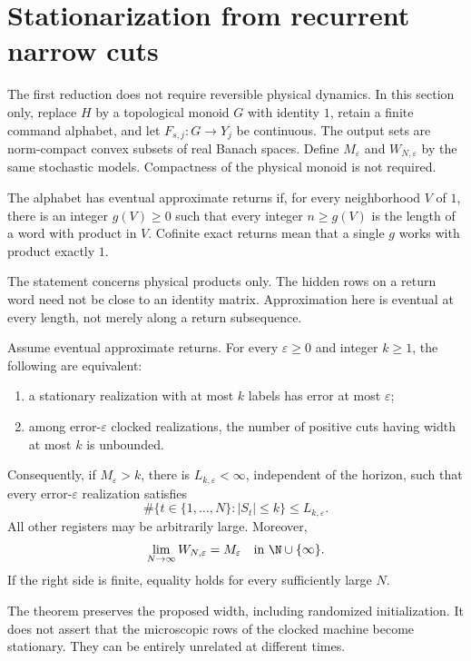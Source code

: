 \section{Stationarization from recurrent narrow cuts}\label{sec:ramsey56}
The first reduction does not require reversible physical dynamics. In this section only, replace $H$ by a topological monoid $G$ with identity $1$, retain a finite command alphabet, and let $F_{s,j}:G\to Y_j$ be continuous. The output sets are norm-compact convex subsets of real Banach spaces. Define $M_\varepsilon$ and $W_{N,\varepsilon}$ by the same stochastic models. Compactness of the physical monoid is not required.

\begin{definition}\label{def:returns56}
The alphabet has eventual approximate returns if, for every neighborhood $V$ of $1$, there is an integer $g(V)\ge0$ such that every integer $n\ge g(V)$ is the length of a word with product in $V$. Cofinite exact returns mean that a single $g$ works with product exactly $1$.
\end{definition}
The statement concerns physical products only. The hidden rows on a return word need not be close to an identity matrix. Approximation here is eventual at every length, not merely along a return subsequence.

\begin{theorem}\label{thm:stationarization56}
Assume eventual approximate returns. For every $\varepsilon\ge0$ and integer $k\ge1$, the following are equivalent:
\begin{enumerate}
\item a stationary realization with at most $k$ labels has error at most $\varepsilon$;
\item among error-$\varepsilon$ clocked realizations, the number of positive cuts having width at most $k$ is unbounded.
\end{enumerate}
Consequently, if $M_\varepsilon>k$, there is $L_{k,\varepsilon}<\infty$, independent of the horizon, such that every error-$\varepsilon$ realization satisfies
\begin{equation}\label{eq:occupation56}
 \#\{t\in\{1,\ldots,N\}:|S_t|\le k\}\le L_{k,\varepsilon}.
\end{equation}
All other registers may be arbitrarily large. Moreover,
\begin{equation}\label{eq:limitminimum56}
                  \lim_{N\to\infty}W_{N,\varepsilon}=M_\varepsilon
                  \quad\hbox{in }\N\cup\{\infty\}.
\end{equation}
If the right side is finite, equality holds for every sufficiently large $N$.
\end{theorem}
The theorem preserves the proposed width, including randomized initialization. It does not assert that the microscopic rows of the clocked machine become stationary. They can be entirely unrelated at different times.

